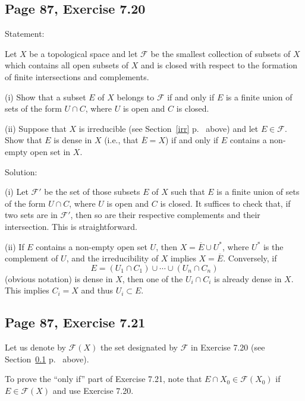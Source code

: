 \documentclass[parskip=half,fontsize=12pt]{scrartcl}%
\begin{document}
\subsection{Page 87, Exercise 7.20}\label{720}%

Statement:

Let $X$ be a topological space and let $\mathcal F$ be the smallest collection of subsets of $X$ which contains all open subsets of $X$ and is closed with respect to the formation of finite intersections and complements.

(i) Show that a subset $E$ of $X$ belongs to $\mathcal F$ if and only if $E$ is a finite union of sets of the form $U\cap C$, where $U$ is open and $C$ is closed.

(ii) Suppose that $X$ is irreducible (see Section~\ref{irr} p.~\pageref{irr} above) and let $E\in\mathcal F$. Show that $E$ is dense in $X$ (i.e., that $\overline E=X$) if and only if $E$ contains a non-empty open set in $X$. 

Solution:

(i) Let $\mathcal F'$ be the set of those subsets $E$ of $X$ such that $E$ is a finite union of sets of the form $U\cap C$, where $U$ is open and $C$ is closed. It suffices to check that, if two sets are in $\mathcal F'$, then so are their respective complements and their intersection. This is straightforward. 

(ii) If $E$ contains a non-empty open set $U$, then $X=\overline E\cup U^*$, where $U^*$ is the complement of $U$, and the irreducibility of $X$ implies $X=\overline E$. Conversely, if 
$$
E=(U_1\cap C_1)\cup\cdots\cup(U_n\cap C_n)
$$ 
(obvious notation) is dense in $X$, then one of the $U_i\cap C_i$ is already dense in $X$. This implies $C_i=X$ and thus $U_i\subset E$.

\subsection{Page 87, Exercise 7.21}%

Let us denote by $\mathcal F(X)$ the set designated by $\mathcal F$ in Exercise 7.20 (see Section~\ref{720} p.~\pageref{720} above). 

To prove the ``only if'' part of Exercise 7.21, note that $E\cap X_0\in\mathcal F(X_0)$ if $E\in\mathcal F(X)$ and use Exercise 7.20.
\end{document}
